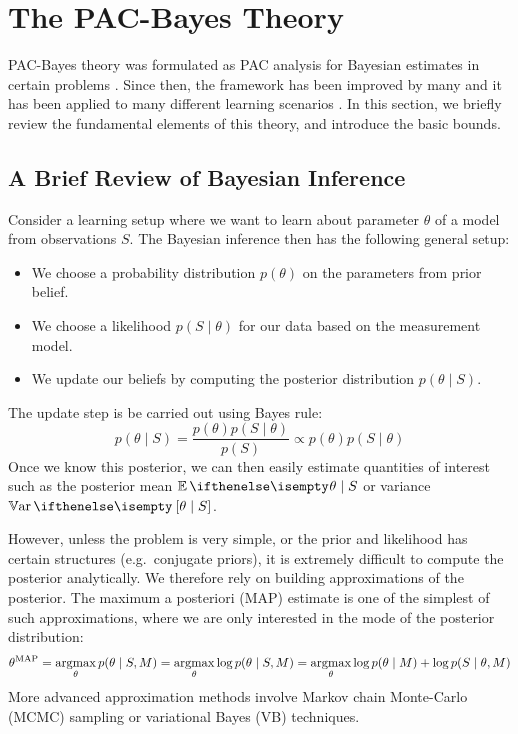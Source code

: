 \section{The PAC-Bayes Theory}

PAC-Bayes theory was formulated as PAC analysis for Bayesian estimates in
certain problems \citep{mcallester1999some}. Since then, the
framework has been improved by many \citep{seeger2002pac, langford2005tutorial,
catoni2007pac, germain2015risk, germain2016pac} and it has been applied to many
different learning scenarios \citep{langford2002pac, seldin2010pac,
seldin2011pac}. In this section, we briefly review the fundamental elements of
this theory, and introduce the basic bounds.

\subsection{A Brief Review of Bayesian Inference}

Consider a learning setup where we want to learn about parameter $\theta$ of a
model from observations $S$. The Bayesian inference then has the following
general setup:
\begin{itemize}
  \item
    We choose a probability distribution $p(\theta)$ on the parameters from
    prior belief.
  \item
    We choose a likelihood $p(S \mid \theta)$ for our data based on the
    measurement model.
  \item
    We update our beliefs by computing the posterior distribution $p(\theta \mid
    S)$.
\end{itemize}
The update step is be carried out using Bayes rule:
\begin{equation}
  \label{eq:bayes-update}
  p(\theta \mid S) = \frac{p(\theta) p(S \mid \theta)}{p(S)} \propto p(\theta)
  p(S \mid \theta)
\end{equation}
Once we know this posterior, we can then easily estimate quantities of interest
such as the posterior mean $\Ev{\theta \mid S}$ or variance $\Var{\theta \mid
S}$.

However, unless the problem is very simple, or the prior and likelihood has
certain structures (e.g.\ conjugate priors), it is extremely difficult to
compute the posterior analytically. We therefore rely on building approximations
of the posterior. The maximum a posteriori (MAP) estimate is one of the simplest
of such approximations, where we are only interested in the mode of the
posterior distribution:
\begin{equation}
  \label{eq:map-estimate}
  \theta^\text{MAP} = \operatorname*{argmax}_\theta p(\theta \mid S, M) = \operatorname*{argmax}_\theta \log
  p(\theta \mid S, M) = \operatorname*{argmax}_\theta \log p(\theta \mid M) + \log p(S \mid
  \theta, M)
\end{equation}
More advanced approximation methods involve Markov chain Monte-Carlo (MCMC)
sampling or variational Bayes (VB) techniques.

